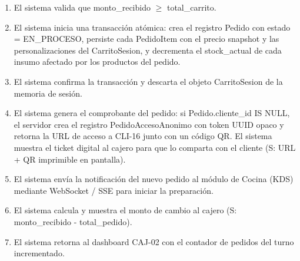 \begin{enumerate}
    \item[XII.] El sistema valida que monto\_recibido $\ge$ total\_carrito.
    \item[XIII.] El sistema inicia una transacción atómica: crea el registro Pedido con estado = EN\_PROCESO, persiste cada PedidoItem con el precio snapshot y las personalizaciones del CarritoSesion, y decrementa el stock\_actual de cada insumo afectado por los productos del pedido.
    \item[XIV.] El sistema confirma la transacción y descarta el objeto CarritoSesion de la memoria de sesión.
    \item[XV.] El sistema genera el comprobante del pedido: si Pedido.cliente\_id IS NULL, el servidor crea el registro PedidoAccesoAnonimo con token UUID opaco y retorna la URL de acceso a CLI-16 junto con un código QR. El sistema muestra el ticket digital al cajero para que lo comparta con el cliente (S: URL + QR imprimible en pantalla).
    \item[XVI.] El sistema envía la notificación del nuevo pedido al módulo de Cocina (KDS) mediante WebSocket / SSE para iniciar la preparación.
    \item[XVII.] El sistema calcula y muestra el monto de cambio al cajero (S: monto\_recibido - total\_pedido).
    \item[XVIII.] El sistema retorna al dashboard CAJ-02 con el contador de pedidos del turno incrementado.
\end{enumerate}


